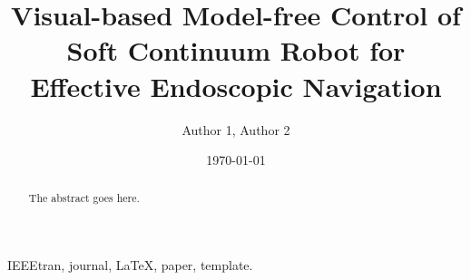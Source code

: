 \documentclass[journal,onecolumn]{IEEEtran}
\author{Author 1, Author 2}
\date{\today}
\title{Visual-based Model-free Control of Soft Continuum Robot for Effective Endoscopic Navigation}
\begin{document}
\maketitle




\begin{abstract}
The abstract goes here.
\end{abstract}

\begin{IEEEkeywords}
IEEEtran, journal, \LaTeX, paper, template.
\end{IEEEkeywords}

\IEEEpeerreviewmaketitle
\end{document}
